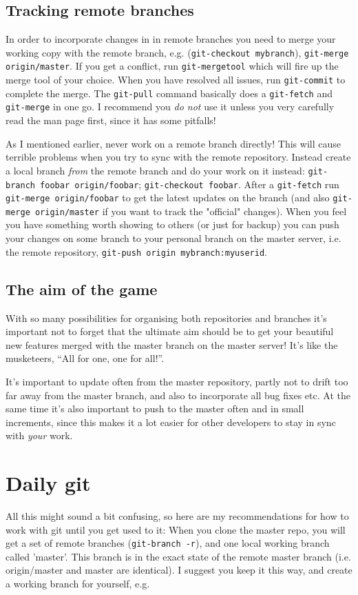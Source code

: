 \documentclass[a4paper,10pt]{article}
\begin{document}
\subsection{Tracking remote branches}
In order to incorporate changes in in remote branches you need to merge your
working copy with the remote branch, e.g. (\texttt{git-checkout mybranch}),
\texttt{git-merge
origin/master}. If you get a conflict, run \texttt{git-mergetool} which will fire up the
merge tool of your choice. When you have resolved all issues, run
\texttt{git-commit}
to complete the merge. The \texttt{git-pull} command basically does a
\texttt{git-fetch} and
\texttt{git-merge} in one go. I recommend you \emph{do not} use it unless you very carefully
read the man page first, since it has some pitfalls!

As I mentioned earlier, never work on a remote branch directly! This will
cause terrible problems when you try to sync with the remote repository.
Instead create a local branch \emph{from} the remote branch and do your work
on it instead: \texttt{git-branch foobar origin/foobar}; \texttt{git-checkout
foobar}. After a \texttt{git-fetch} run \texttt{git-merge origin/foobar} to
get the latest updates on the branch (and also \texttt{git-merge
origin/master} if you want to track the "official" changes).  When you feel
you have something worth showing to others (or just for backup) you can push
your changes on some branch to your personal branch on the master server, i.e.
the remote repository, \texttt{git-push origin mybranch:myuserid}.

\subsection{The aim of the game}
With so many possibilities for organising both repositories and branches it's
important not to forget that the ultimate aim should be to get your beautiful
new features merged with the master branch on the master server! It's like the
musketeers, ``All for one, one for all!''. 

It's important to update often from the master repository, partly not to drift
too far away from the master branch, and also to incorporate all bug fixes
etc. At the same time it's also important to push to the master often and in
small increments, since this makes it a lot easier for other developers to
stay in sync with \emph{your} work.

\section{Daily git}
All this might sound a bit confusing, so here are my recommendations for
how to work with git until you get used to it:
When you clone the master repo, you will get a set of remote branches
(\texttt{git-branch -r}), and one local working branch called 'master'. This branch is
in the exact state of the remote master branch (i.e. origin/master and master
are identical). I suggest you keep it this way, and create a working branch
for yourself, e.g. 
\end{document}
